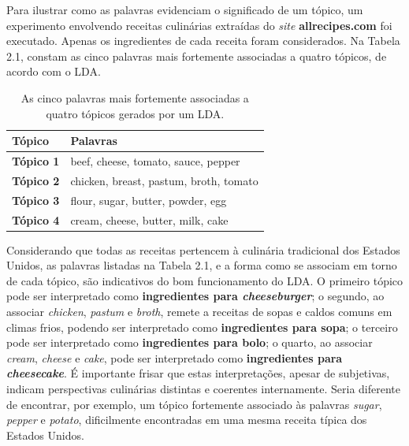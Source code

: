 Para ilustrar como as palavras evidenciam o significado de um tópico, um experimento envolvendo receitas culinárias extraídas do \emph{site} \textbf{allrecipes.com} foi executado. Apenas os ingredientes de cada receita foram considerados. Na Tabela 2.1, constam as cinco palavras mais fortemente associadas a quatro tópicos, de acordo com o LDA. %

\begin{table}[t]
\centering
\label{LDA:1}
\begin{tabular}{| l | p{7cm} | }
\hline
\textbf{Tópico} & \textbf{Palavras} \\ \hline
\textbf{Tópico 1} & beef, cheese, tomato, sauce, pepper \\ \hline
\textbf{Tópico 2} & chicken, breast, pastum, broth, tomato \\ \hline
\textbf{Tópico 3} & flour, sugar, butter, powder, egg  \\ \hline
\textbf{Tópico 4} & cream, cheese, butter, milk, cake \\ \hline
\end{tabular}
\caption{As cinco palavras mais fortemente associadas a quatro tópicos gerados por um LDA.}
\end{table}

Considerando que todas as receitas pertencem à culinária tradicional dos Estados Unidos, as palavras listadas na Tabela 2.1, e a forma como se associam em torno de cada tópico, são indicativos do bom funcionamento do LDA. O primeiro tópico pode ser interpretado como \textbf{ingredientes para          \emph{cheeseburger}}; o segundo, ao associar \emph{chicken}, \emph{pastum} e \emph{broth}, remete a receitas de sopas e caldos comuns em climas frios, podendo ser interpretado como \textbf{ingredientes para sopa}; o terceiro pode ser interpretado como \textbf{ingredientes para bolo}; o quarto, ao associar \emph{cream}, \emph{cheese} e \emph{cake}, pode ser interpretado como \textbf{ingredientes para \emph{cheesecake}}. É importante frisar que estas interpretações, apesar de subjetivas, indicam perspectivas culinárias distintas e coerentes internamente. Seria diferente de encontrar, por exemplo, um tópico fortemente associado às palavras \emph{sugar}, \emph{pepper} e \emph{potato}, dificilmente encontradas em uma mesma receita típica dos Estados Unidos.



